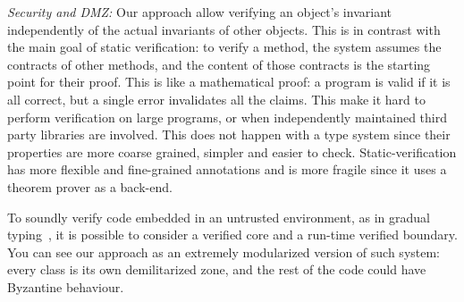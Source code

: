 



\LINE
\textit{Security and DMZ:}
Our approach allow verifying an object's invariant independently of the actual invariants of other objects.
This is in contrast with the main goal of static verification: to verify a method, the system assumes the contracts of other methods, and the content of those contracts is the starting point for their proof.
This is like a mathematical proof: a program is valid if it is all correct, but a single error invalidates all the claims. This make it hard to perform verification on large programs, or when independently maintained third party libraries are involved.
This does not happen with a type system since their properties are more coarse grained, simpler and easier to check.
 Static-verification has more flexible and fine-grained annotations and is more fragile since it uses a theorem prover as a back-end.

To soundly verify code embedded in an untrusted environment, as in gradual typing~\cite{??}, it is possible to 
consider a verified core and a run-time verified boundary.
You can see our approach as an extremely modularized	version of such system: every class is its own demilitarized zone, and the rest 	of the code could have Byzantine behaviour.

